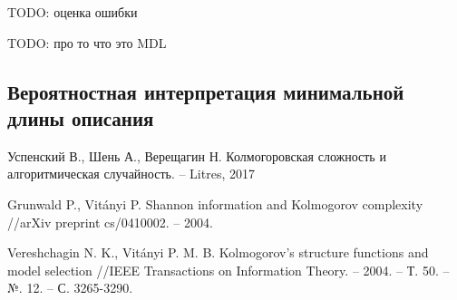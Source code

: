 \documentclass[../main.tex]{subfiles}
\begin{document}
TODO: оценка ошибки

TODO: про то что это MDL
\subsection{Вероятностная интерпретация минимальной длины описания}




\begin{thebibliography}{99}
	Успенский В., Шень А., Верещагин Н. Колмогоровская сложность и алгоритмическая случайность. – Litres, 2017

Grunwald P., Vitányi P. Shannon information and Kolmogorov complexity //arXiv preprint cs/0410002. – 2004.

Vereshchagin N. K., Vitányi P. M. B. Kolmogorov's structure functions and model selection //IEEE Transactions on Information Theory. – 2004. – Т. 50. – №. 12. – С. 3265-3290.
\end{thebibliography}
\end{document}
